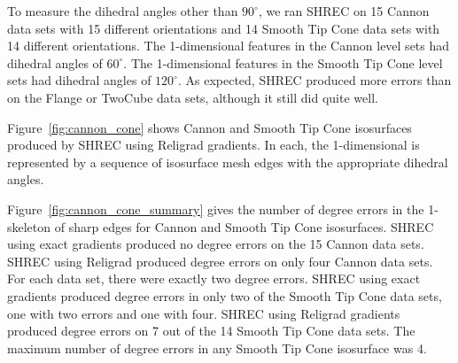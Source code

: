 To measure the dihedral angles other than $90^\circ$,
we ran SHREC on 15 Cannon data sets with 15 different orientations
and 14 Smooth Tip Cone data sets with 14 different orientations.
The 1-dimensional features in the Cannon level sets
had dihedral angles of $60^\circ$.
The 1-dimensional features in the Smooth Tip Cone level sets
had dihedral angles of $120^\circ$.
As expected, SHREC produced more errors than on the Flange or TwoCube
data sets, although it still did quite well.

Figure~\ref{fig:cannon_cone} shows Cannon and Smooth Tip Cone isosurfaces
produced by SHREC using Religrad gradients.
In each, the 1-dimensional is represented by a sequence 
of isosurface mesh edges with the appropriate dihedral angles.

Figure~\ref{fig:cannon_cone_summary} gives the number of degree errors
in the 1-skeleton of sharp edges
for Cannon and Smooth Tip Cone isosurfaces.
SHREC using exact gradients produced no degree errors 
on the 15 Cannon data sets.
SHREC using Religrad produced degree errors on only four Cannon data sets.
For each data set, there were exactly two degree errors.
SHREC using exact gradients produced degree errors in only two 
of the Smooth Tip Cone data sets,
one with two errors and one with four.
SHREC using Religrad gradients produced degree errors on 7 out of the 14
Smooth Tip Cone data sets.
The maximum number of degree errors in any Smooth Tip Cone isosurface
was 4.

